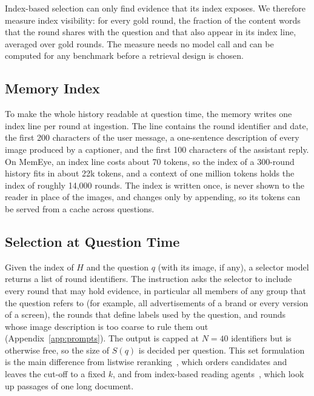 Index-based selection can only find evidence that its index exposes. We therefore measure index visibility: for every gold round, the fraction of the content words that the round shares with the question and that also appear in its index line, averaged over gold rounds. The measure needs no model call and can be computed for any benchmark before a retrieval design is chosen.

\subsection{Memory Index}
\label{sec:index}

To make the whole history readable at question time, the memory writes one index line per round at ingestion. The line contains the round identifier and date, the first 200 characters of the user message, a one-sentence description of every image produced by a captioner, and the first 100 characters of the assistant reply. On MemEye, an index line costs about 70 tokens, so the index of a 300-round history fits in about 22k tokens, and a context of one million tokens holds the index of roughly 14,000 rounds. The index is written once, is never shown to the reader in place of the images, and changes only by appending, so its tokens can be served from a cache across questions.

\subsection{Selection at Question Time}
\label{sec:select}

Given the index of $H$ and the question $q$ (with its image, if any), a selector model returns a list of round identifiers. The instruction asks the selector to include every round that may hold evidence, in particular all members of any group that the question refers to (for example, all advertisements of a brand or every version of a screen), the rounds that define labels used by the question, and rounds whose image description is too coarse to rule them out (Appendix~\ref{app:prompts}). The output is capped at $N{=}40$ identifiers but is otherwise free, so the size of $S(q)$ is decided per question. This set formulation is the main difference from listwise reranking~\citep{sun2023rankgpt}, which orders candidates and leaves the cut-off to a fixed $k$, and from index-based reading agents~\citep{lee2024readagent,chen2023memwalker}, which look up passages of one long document.

